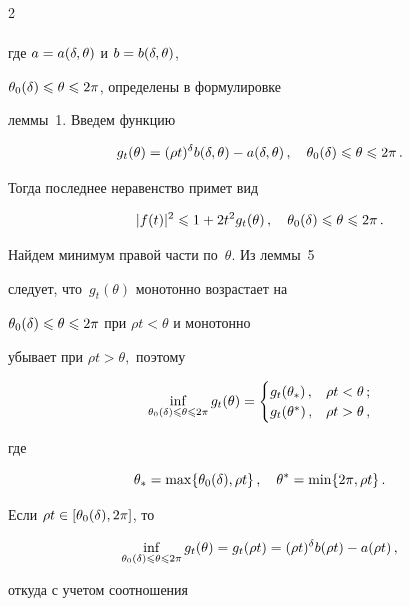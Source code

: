 \begin{multicols}{2}
\begin{multline}
\end{multline}

где $a=a(\delta,\theta)$ и $b=b(\delta,\theta)$,

$\theta_0(\delta)\leqslant\theta\leqslant2\pi$, определены в формулировке

леммы~1. Введем функцию

$$

g_t(\theta)=(\rho t)^\d b(\d,\theta)-a(\d,\theta)\,,\quad

\theta_0(\d)\le\theta\le2\pi\,.

$$

Тогда последнее неравенство примет вид

$$

|f(t)|^2\le 1+2t^2g_t(\theta)\,,\quad \theta_0(\d)\le\theta\le2\pi\,.

$$

Найдем минимум правой части по~$\theta$. Из леммы~5

следует, что~$g_t(\theta)$ монотонно возрастает на

$\theta_0(\delta)\leqslant\theta\leqslant2\pi$ при $\rho t<\theta$ и монотонно

убывает при $\rho t>\theta,$ поэтому

$$

\inf_{\theta_0(\d)\le\theta\le2\pi}g_t(\theta)=

\begin{cases}

g_t(\theta_*)\,,&\rho t<\theta\,;\\

g_t(\theta^*)\,,&\rho t>\theta\,,

\end{cases}

$$

где

$$

\theta_*=\max\{\theta_0(\d),\rho t\}\,, \quad \theta^*=\min\{2\pi,\rho

t\}\,.

$$

Если $\rho t\in[\theta_0(\delta),2\pi]$, то

$$

\inf_{\theta_0(\d)\le\theta\le2\pi}g_t(\theta)= g_t(\rho t)= (\rho

t)^{\d}b(\rho t)-a(\rho t)\,,

$$

откуда с учетом соотношения

\begin{align*}


\end{align*}
\end{multicols}
